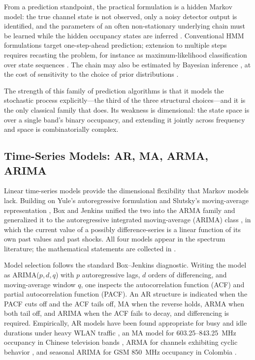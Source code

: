 \documentclass[lettersize,journal]{IEEEtran}
\begin{document}
From a prediction standpoint, the practical formulation is a hidden
Markov model: the true channel state is not observed, only a noisy
detector output is identified, and the parameters of an often non-stationary
underlying chain must be learned while the hidden occupancy states are
inferred \cite{Chen2011, Akbar2007}.
Conventional HMM formulations target one-step-ahead prediction;
extension to multiple steps requires recasting the problem,
for instance as maximum-likelihood classification over state sequences
\cite{Saad2016}. The chain may also be estimated by Bayesian inference
\cite{Xing2013b}, at the cost of sensitivity to the choice of prior
distributions \cite{Pan2026}.

The strength of this family of prediction algorithms is that it models the
stochastic process explicitly---the third of the three structural
choices---and it is the only classical family that does.
Its weakness is dimensional: the state space is over a single band's
binary occupancy, and extending it jointly across frequency and space is
combinatorially complex.

\subsection{\textbf{Time-Series Models: AR, MA, ARMA, ARIMA}}
Linear time-series models provide the dimensional flexibility that
Markov models lack. Building on Yule's autoregressive formulation
\cite{Yule1927} and Slutsky's moving-average representation
\cite{Slutsky1937}, Box and Jenkins unified the two into the ARMA family
and generalized it to the autoregressive integrated moving-average
(ARIMA) class \cite{Box1978}, in which the current value of a possibly
difference-series is a linear function of its own past values and past
shocks. All four models appear in the spectrum literature; the
mathematical statements are collected in \cite{Ding2018}.

Model selection follows the standard Box--Jenkins diagnostic. Writing
the model as ARIMA($p,d,q$) with $p$ autoregressive lags, $d$ orders of
differencing, and moving-average window $q$, one inspects the
autocorrelation function (ACF) and partial autocorrelation function
(PACF).
An AR structure is indicated when the PACF cuts off and the ACF
tails off, MA when the reverse holds, ARMA when both tail off, and ARIMA
when the ACF fails to decay, and differencing is required.
Empirically, AR models have been found appropriate for busy and idle
durations under heavy WLAN traffic \cite{Hou2021}, an MA model for
603.25--843.25~MHz occupancy in Chinese television bands \cite{Su2009}, ARMA for
channels exhibiting cyclic behavior \cite{Tabassam2011}, and seasonal ARIMA for
GSM 850~MHz occupancy in Colombia \cite{Pedraza2016}.
\end{document}

